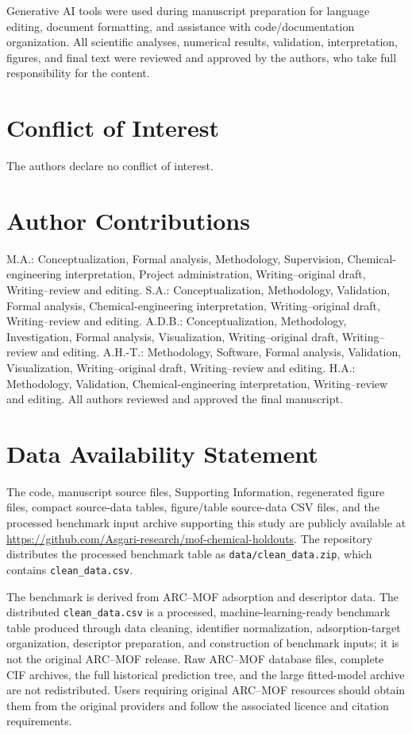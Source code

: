\documentclass[11pt,a4paper]{article}
\begin{document}
Generative AI tools were used during manuscript preparation for language editing, document formatting, and assistance with code/documentation organization. All scientific analyses, numerical results, validation, interpretation, figures, and final text were reviewed and approved by the authors, who take full responsibility for the content.

\section*{Conflict of Interest}
The authors declare no conflict of interest.

\section*{Author Contributions}
M.A.: Conceptualization, Formal analysis, Methodology, Supervision, Chemical-engineering interpretation, Project administration, Writing--original draft, Writing--review and editing. S.A.: Conceptualization, Methodology, Validation, Formal analysis, Chemical-engineering interpretation, Writing--original draft, Writing--review and editing. A.D.B.: Conceptualization, Methodology, Investigation, Formal analysis, Visualization, Writing--original draft, Writing--review and editing. A.H.-T.: Methodology, Software, Formal analysis, Validation, Visualization, Writing--original draft, Writing--review and editing. H.A.: Methodology, Validation, Chemical-engineering interpretation, Writing--review and editing. All authors reviewed and approved the final manuscript.

\section*{Data Availability Statement}
The code, manuscript source files, Supporting Information, regenerated figure files, compact source-data tables, figure/table source-data CSV files, and the processed benchmark input archive supporting this study are publicly available at \url{https://github.com/Asgari-research/mof-chemical-holdouts}. The repository distributes the processed benchmark table as \texttt{data/clean\_data.zip}, which contains \texttt{clean\_data.csv}.

The benchmark is derived from ARC--MOF adsorption and descriptor data. The distributed \texttt{clean\_data.csv} is a processed, machine-learning-ready benchmark table produced through data cleaning, identifier normalization, adsorption-target organization, descriptor preparation, and construction of benchmark inputs; it is not the original ARC--MOF release. Raw ARC--MOF database files, complete CIF archives, the full historical prediction tree, and the large fitted-model archive are not redistributed. Users requiring original ARC--MOF resources should obtain them from the original providers and follow the associated licence and citation requirements.
\end{document}
